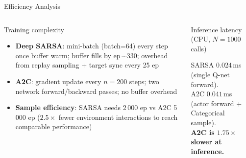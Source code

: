 \documentclass[aspectratio=169, 10pt]{beamer}
\begin{document}
\begin{frame}{Efficiency Analysis}
  \begin{columns}[T]
      \begin{block}{Training complexity}
        \begin{itemize}
          \item \textbf{Deep SARSA}: mini-batch (batch=64) every step
                once buffer warm; buffer fills by ep\,$\sim$330;
                overhead from replay sampling + target sync every 25 ep
          \item \textbf{A2C}: gradient update every $n=200$ steps;
                two network forward/backward passes; no buffer overhead
          \item \textbf{Sample efficiency}: SARSA needs 2\,000 ep
                vs A2C 5\,000 ep ($2.5\times$ fewer environment
                interactions to reach comparable performance)
        \end{itemize}
      \end{block}
      \begin{block}{Inference latency (CPU, $N=1000$ calls)}
        \vspace{0.3em}
        \begin{center}
        \end{center}
        \small\color{silver!80}
        SARSA $0.024\,$ms (single Q-net forward).\\
        A2C $0.041\,$ms (actor forward + Categorical sample).\\
        \textbf{A2C is $1.75\times$ slower at inference.}
      \end{block}
  \end{columns}
\end{frame}
\end{document}
